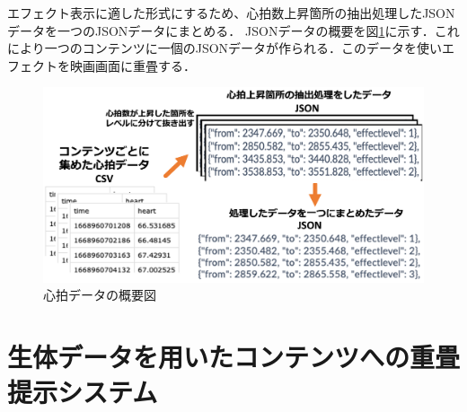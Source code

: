 エフェクト表示に適した形式にするため、心拍数上昇箇所の抽出処理したJSONデータを一つのJSONデータにまとめる．
JSONデータの概要を図\ref{gaiyou}に示す．これにより一つのコンテンツに一個のJSONデータが作られる．このデータを使いエフェクトを映画画面に重畳する．

\begin{figure}[H]
    \centering
    \includegraphics[width=16cm]{images/chapter3/system.png}
    \caption{心拍データの概要図}
    \label{gaiyou}
\end{figure}







\section{生体データを用いたコンテンツへの重畳提示システム}
 
